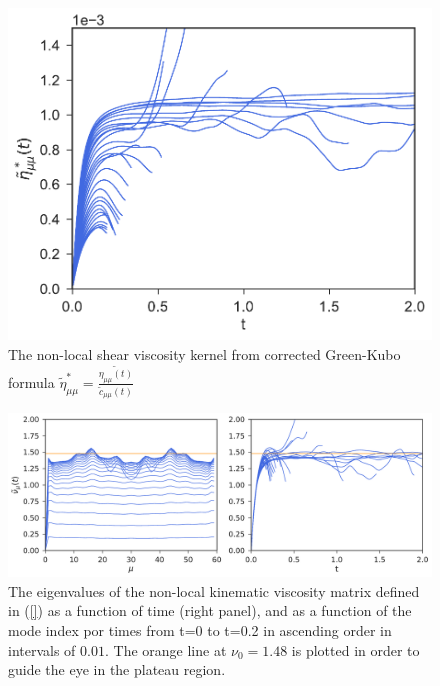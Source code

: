 \documentclass[a4paper,openright,12pt]{book}
\begin{document}
\begin{figure}[h!]
  \centering
\includegraphics[scale=0.45]{EtaStartFourier-PBC}
\caption[The non-local shear viscosity kernel for PBC system]{The non-local shear viscosity kernel from corrected Green-Kubo formula $\tilde{\eta}^*_{\mu\mu}=\frac{\tilde{\eta_{\mu\mu}(t)}}{\tilde{c}_{\mu\mu}(t)}$}
\label{fig:EtaStartFourier-PBC}
\end{figure}
\begin{figure}[h!]
  \centering
\includegraphics[scale=0.45]{KinVisctFourier-PBC}
\caption[The eigenvalues of the non-local kinematic viscosity matrix for PBC system]{The eigenvalues of the non-local kinematic viscosity matrix defined in (\ref{}) as a function of time (right panel), and as a function of the mode index por times from t=0 to t=0.2 in ascending order in intervals of $0.01$. The orange line at $\nu_0=1.48$ is plotted in order to guide the eye in the plateau region.}
\label{fig:KinVisctFourier-PBC}
\end{figure}

\newpage
\end{document}
